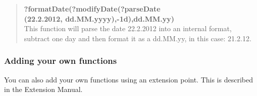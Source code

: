 \begin{quote}
\textbf{?formatDate(?modifyDate(?parseDate\\(22.2.2012, dd.MM.yyyy),-1d),dd.MM.yy)}\\
This function will parse the date 22.2.2012 into an internal format, subtract one day and then format it as a dd.MM.yy, in this case: 21.2.12.
\end{quote}



\subsubsection{Adding your own functions}
You can also add your own functions using an extension point. This is described in the Extension Manual. 



